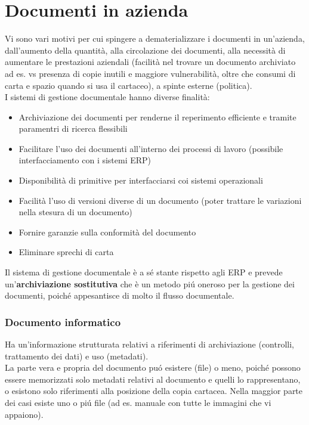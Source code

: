 \section{Documenti in azienda}

Vi sono vari motivi per cui spingere a dematerializzare i documenti in
un'azienda, dall'aumento della quantit\`a, alla circolazione dei
documenti, alla necessit\`a di aumentare le prestazioni aziendali
(facilit\`a nel trovare un documento archiviato ad es. vs presenza di
copie inutili e maggiore vulnerabilit\`a, oltre che consumi di carta e
spazio quando si usa il cartaceo), a spinte esterne (politica).\\
I sistemi di gestione documentale hanno diverse finalit\`a:

\begin{itemize}

\item
  Archiviazione dei documenti per renderne il reperimento efficiente e tramite 
  paramentri di ricerca flessibili
\item 
  Facilitare l'uso dei documenti all'interno dei processi di lavoro (possibile
  interfacciamento con i sistemi ERP)
\item
  Disponibilit\`a di primitive per interfacciarsi coi sistemi operazionali
\item
  Facilit\`a l'uso di versioni diverse di un documento (poter trattare le
  variazioni nella stesura di un documento)
\item
  Fornire garanzie sulla conformit\`a del documento
\item
  Eliminare sprechi di carta
\end{itemize}

Il sistema di gestione documentale \`e a s\'e stante rispetto agli ERP e
prevede un'\textbf{archiviazione sostitutiva} che \`e un metodo pi\'u oneroso 
per la gestione dei documenti, poich\'e appesantisce di molto il flusso
documentale.

\subsubsection{Documento informatico}

Ha un'informazione strutturata relativi a riferimenti di archiviazione
(controlli, trattamento dei dati) e uso (metadati).\\
La parte vera e propria del documento pu\'o esistere (file) o meno, poich\'e
possono essere memorizzati solo metadati relativi al documento e quelli
lo rappresentano, o esistono solo riferimenti alla posizione della copia
cartacea. Nella maggior parte dei casi esiste uno o pi\'u file (ad es.
manuale con tutte le immagini che vi appaiono).

